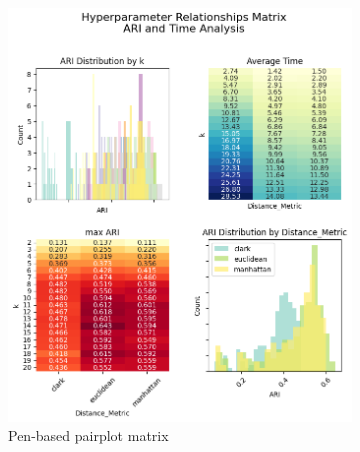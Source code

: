 \begin{figure}[H]
    \centering
    \begin{subfigure}{0.49\textwidth}
        \centering
        \includegraphics[width=\linewidth]{figures/KMeans/penbased_hyperparameter_pairplot_matrix.png}
        \caption{Pen-based pairplot matrix}
    \end{subfigure}
    \hfill
    \begin{subfigure}{0.49\textwidth}
        \centering

\end{subfigure}
\end{figure}
